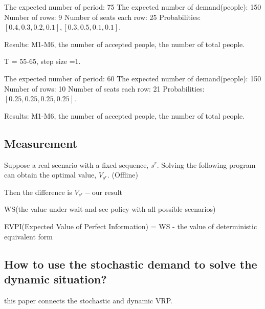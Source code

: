 The expected number of period: 75
The expected number of demand(people): 150
Number of rows: 9
Number of seats each row: 25
Probabilities: $[0.4, 0.3, 0.2, 0.1], [0.3, 0.5, 0.1, 0.1]$.

Results: M1-M6, the number of accepted people, the number of total people.

T = 55-65, step size =1.

The expected number of period: 60
The expected number of demand(people): 150
Number of rows: 10
Number of seats each row: 21
Probabilities: $[0.25, 0.25, 0.25, 0.25]$.

Results: M1-M6, the number of accepted people, the number of total people.

\subsection{Measurement}

Suppose a real scenario with a fixed sequence, $s^{r}$. Solving the following program can obtain the optimal value, $V_{s^{r}}$. (Offline)

Then the difference is $V_{s^{r}} - \text{our result}$

WS(the value under wait-and-see policy with all possible scenarios)

EVPI(Expected Value of Perfect Information) = WS - the value of deterministic equivalent form


\subsection{How to use the stochastic demand to solve the dynamic situation?}

\cite{bent2004scenario} this paper connects the stochastic and dynamic VRP.

\newpage
